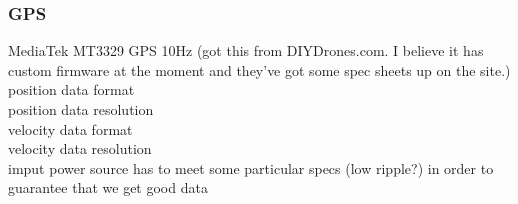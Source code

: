 \documentclass{article}
\begin{document}
\subsubsection{GPS}
MediaTek MT3329 GPS 10Hz (got this from DIYDrones.com.  I believe it has custom firmware at the moment and they've got some spec sheets up on the site.)\\
position data format\\
position data resolution\\
velocity data format\\
velocity data resolution\\
imput power source has to meet some particular specs (low ripple?) in order to guarantee that we get good data\\
\end{document}
